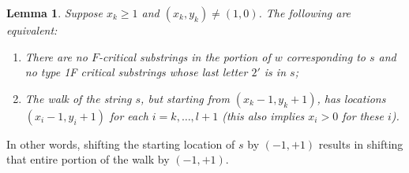 \documentclass[10pt]{amsart}
\newtheorem{lemma}[theorem]{Lemma}
\theoremstyle{definition}
\begin{document}
\begin{lemma} \label{lem:shifting-walks-F}
Suppose $x_k\ge 1$ and $(x_k,y_k)\neq (1,0)$. The following are equivalent:
\begin{enumerate}[label={(\roman*)}]
\item\label{lemma5.12_i} %
There are no $F$-critical substrings in the portion of $w$ corresponding to $s$ and no type 1F critical substrings whose last letter $2'$ is in $s$;
\item\label{lemma5.12_ii} %
The walk of the string $s$, but starting from $(x_k-1,y_k+1)$, has locations $(x_i-1,y_i+1)$ for each $i = k, \ldots, l+1$ \textup{(}this also implies $x_i > 0$ for these $i$\textup{)}.
\end{enumerate}
\end{lemma}
In other words, shifting the starting location of $s$ by $(-1,+1)$ results in shifting that entire portion of the walk by $(-1,+1)$.
\end{document}
